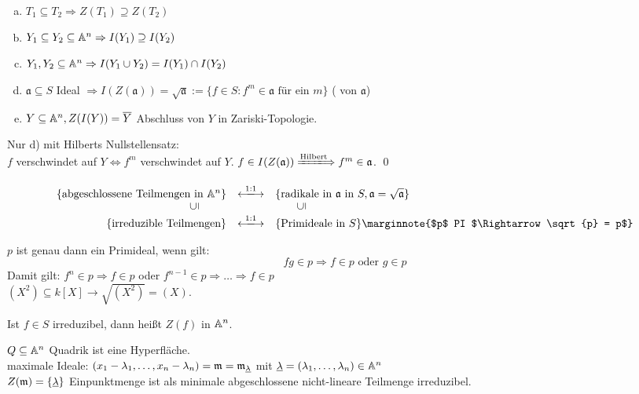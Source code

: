 \begin{satz}
	\begin{enumerate}[a)]
		\item $T_1 \subseteq T_2 \Rightarrow Z(T_1) \supseteq Z(T_2)$
		\item $Y_1 \subseteq Y_2 \subseteq \mathbb{A}^n \Rightarrow I(Y_1) \supseteq I(Y_2)$
		\item $Y_1,Y_2 \subseteq \mathbb{A}^n \Rightarrow I(Y_1 \cup Y_2) = I(Y_1) \cap I(Y_2)$
		\item $\mathfrak{a} \subseteq S$ Ideal $\Rightarrow I(Z(\mathfrak{a})) = \sqrt{\mathfrak{a}} := \{f \in S : f^m \in \mathfrak{a} \text{ für ein } m\}$ ( von $\mathfrak{a}$) 
		\item $Y \subseteq \mathbb{A}^n, Z(I(Y)) = \overline{Y}$ Abschluss von $Y$ in Zariski-Topologie.
	\end{enumerate}
\end{satz}

	Nur d) mit Hilberts Nullstellensatz: \\
	$f$ verschwindet auf $Y \Leftrightarrow f^m$ verschwindet auf $Y$. $f \in I(Z(\mathfrak{a})) \xLongrightarrow{\text{Hilbert}} f^m \in \mathfrak{a}$. \qed

\begin{satz}
	\[ \begin{array}{rcl}
	\{\text{abgeschlossene Teilmengen in } \aff^n\} & \xlongleftrightarrow{1:1} & \{\text{radikale in } \mathfrak{a} \text{ in } S, \mathfrak{a} = \sqrt{\mathfrak{a}}\} \\ 
	 \rotatebox{90}{$\subseteq$} \qquad \phantom{a} &  & \qquad \rotatebox{90}{$\subseteq$} \\ 
	\{\text{irreduzible Teilmengen}\} & \xlongleftrightarrow{1:1} & \{\text{Primideale in } S\} \marginnote{$p$ PI $\Rightarrow \sqrt{p} = p$}
	\end{array}  \]
\end{satz}

	$p$ ist genau dann ein Primideal, wenn gilt:
	\[ fg \in p \Rightarrow f \in p \text{ oder } g \in p\]
	Damit gilt: $f^n \in p \Rightarrow f \in p$ oder $f^{n-1} \in p \Rightarrow \dots \Rightarrow f \in p$ \\
	$(X^2) \subseteq k[X] \rightarrow \sqrt{(X^2)} = (X)$.
	
	Ist $f \in S$ irreduzibel, dann heißt $Z(f)$  in $\mathbb{A}^n$.
	
	$Q \subseteq \mathbb{A}^n$ Quadrik ist eine Hyperfläche. \\
	maximale Ideale: $(x_1-\lambda_1, \dots, x_n - \lambda_n) = \mathfrak{m} = \mathfrak{m}_{\underline{\lambda}}$ mit $\underline{\lambda} = (\lambda_1,\dots,\lambda_n) \in \mathbb{A}^n$ \\
	$Z(\mathfrak{m}) = \{ \underline{\lambda} \}$ Einpunktmenge ist als minimale abgeschlossene nicht-lineare Teilmenge irreduzibel.
	
